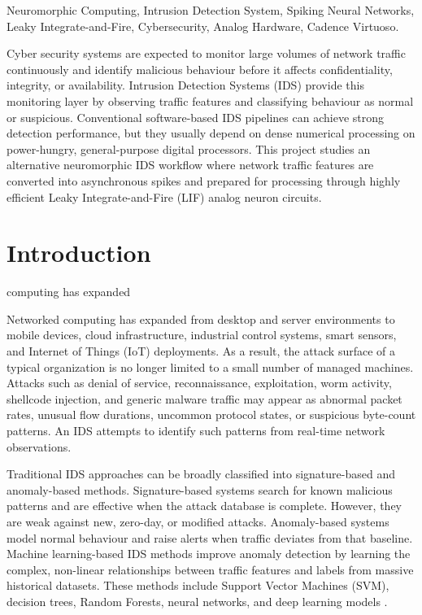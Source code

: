 \documentclass{ieeeaccess}
\begin{document}
\begin{keywords}
Neuromorphic Computing, Intrusion Detection System, Spiking Neural Networks, Leaky Integrate-and-Fire, Cybersecurity, Analog Hardware, Cadence Virtuoso.
\end{keywords}

\maketitle


Cyber security systems are expected to monitor large volumes of network traffic continuously and identify malicious behaviour before it affects confidentiality, integrity, or availability. Intrusion Detection Systems (IDS) provide this monitoring layer by observing traffic features and classifying behaviour as normal or suspicious. Conventional software-based IDS pipelines can achieve strong detection performance, but they usually depend on dense numerical processing on power-hungry, general-purpose digital processors. This project studies an alternative neuromorphic IDS workflow where network traffic features are converted into asynchronous spikes and prepared for processing through highly efficient Leaky Integrate-and-Fire (LIF) analog neuron circuits.

\section{Introduction}
 computing has expanded

Networked computing has expanded from desktop and server environments to mobile devices, cloud infrastructure, industrial control systems, smart sensors, and Internet of Things (IoT) deployments. As a result, the attack surface of a typical organization is no longer limited to a small number of managed machines. Attacks such as denial of service, reconnaissance, exploitation, worm activity, shellcode injection, and generic malware traffic may appear as abnormal packet rates, unusual flow durations, uncommon protocol states, or suspicious byte-count patterns. An IDS attempts to identify such patterns from real-time network observations.

Traditional IDS approaches can be broadly classified into signature-based and anomaly-based methods. Signature-based systems search for known malicious patterns and are effective when the attack database is complete. However, they are weak against new, zero-day, or modified attacks. Anomaly-based systems model normal behaviour and raise alerts when traffic deviates from that baseline. Machine learning-based IDS methods improve anomaly detection by learning the complex, non-linear relationships between traffic features and labels from massive historical datasets. These methods include Support Vector Machines (SVM), decision trees, Random Forests, neural networks, and deep learning models \cite{Buczak2016}.
\end{document}
